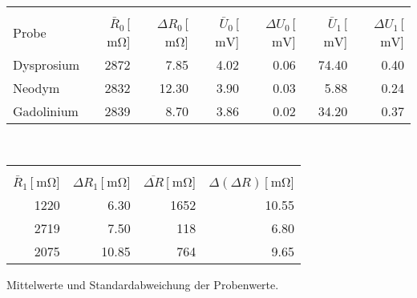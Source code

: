 
\begin{table}[!h]
\begin{center}
\begin{tabular}{|l|r|r|r|r|r|r|}
\hline
 & & & & & & \\
Probe & $\bar R_\mathrm{0}$\,[$\SI{}{\milli\ohm}$]& $\Delta R_\mathrm{0}$\,[$\SI{}{\milli\ohm}$] & $\bar U_\mathrm{0}$\,[$\SI{}{\milli\volt}$] & $\Delta U_\mathrm{0}$\,[$\SI{}{\milli\volt}$] & $\bar U_\mathrm{1}$\,[$\SI{}{\milli\volt}$] & $\Delta U_\mathrm{1}$\,[$\SI{}{\milli\volt}$]\\
\hline
\hline

Dysprosium & 2872 & 7.85 & 4.02 & 0.06 & 74.40 & 0.40\\
Neodym & 2832 & 12.30 & 3.90 & 0.03 & 5.88 & 0.24\\
Gadolinium & 2839 & 8.70 & 3.86 & 0.02 & 34.20 & 0.37\\

\hline
\end{tabular}
\end{center}
\begin{center}
\begin{tabular}{|r|r|r|r|}
\hline
&&&\\
$\bar R_\mathrm{1}$\,[$\SI{}{\milli\ohm}$] & $\Delta R_\mathrm{1}$\,[$\SI{}{\milli\ohm}$] & $\overline{\Delta R}$\,[$\SI{}{\milli\ohm}$] & $\Delta(\Delta R)$\,[$\SI{}{\milli\ohm}$]\\
\hline
\hline
1220 & 6.30 & 1652 & 10.55\\
2719 & 7.50 & 118  & 6.80\\
2075 & 10.85 & 764 & 9.65\\
\hline
\end{tabular}
\caption\,{Mittelwerte und Standardabweichung der Probenwerte.}
\label{Mittelwerte}
\end{center}
\end{table}